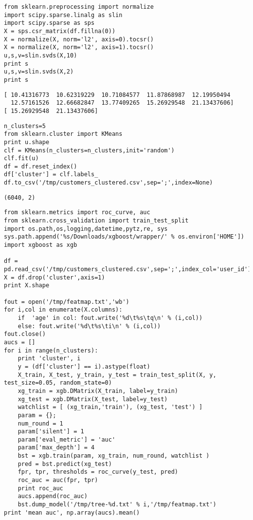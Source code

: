\documentclass[12pt,fleqn]{article}\usepackage{../common}
\begin{document}
\begin{verbatim}
from sklearn.preprocessing import normalize
import scipy.sparse.linalg as slin
import scipy.sparse as sps
X = sps.csr_matrix(df.fillna(0))
X = normalize(X, norm='l2', axis=0).tocsr()
X = normalize(X, norm='l2', axis=1).tocsr()    
u,s,v=slin.svds(X,10)
print s
u,s,v=slin.svds(X,2)
print s
\end{verbatim}

\begin{verbatim}
[ 10.41316773  10.62319229  10.71084577  11.87868987  12.19950494
  12.57161526  12.66682847  13.77409265  15.26929548  21.13437606]
[ 15.26929548  21.13437606]
\end{verbatim}

\begin{verbatim}
n_clusters=5
from sklearn.cluster import KMeans
print u.shape
clf = KMeans(n_clusters=n_clusters,init='random')
clf.fit(u)    
df = df.reset_index()
df['cluster'] = clf.labels_
df.to_csv('/tmp/customers_clustered.csv',sep=';',index=None)
\end{verbatim}

\begin{verbatim}
(6040, 2)
\end{verbatim}

\begin{verbatim}
from sklearn.metrics import roc_curve, auc
from sklearn.cross_validation import train_test_split
import os.path,os,logging,datetime,pytz,re, sys
sys.path.append('%s/Downloads/xgboost/wrapper/' % os.environ['HOME'])
import xgboost as xgb

df = pd.read_csv('/tmp/customers_clustered.csv',sep=';',index_col='user_id')
X = df.drop('cluster',axis=1)
print X.shape

fout = open('/tmp/featmap.txt','wb')
for i,col in enumerate(X.columns):
    if  'age' in col: fout.write('%d\t%s\tq\n' % (i,col))
    else: fout.write('%d\t%s\ti\n' % (i,col))    
fout.close()
aucs = []
for i in range(n_clusters):
    print 'cluster', i
    y = (df['cluster'] == i).astype(float)
    X_train, X_test, y_train, y_test = train_test_split(X, y, test_size=0.05, random_state=0)
    xg_train = xgb.DMatrix(X_train, label=y_train)
    xg_test = xgb.DMatrix(X_test, label=y_test)    
    watchlist = [ (xg_train,'train'), (xg_test, 'test') ]    
    param = {}; 
    num_round = 1
    param['silent'] = 1
    param['eval_metric'] = 'auc'
    param['max_depth'] = 4
    bst = xgb.train(param, xg_train, num_round, watchlist )
    pred = bst.predict(xg_test)
    fpr, tpr, thresholds = roc_curve(y_test, pred)
    roc_auc = auc(fpr, tpr)
    print roc_auc
    aucs.append(roc_auc)
    bst.dump_model('/tmp/tree-%d.txt' % i,'/tmp/featmap.txt')
print 'mean auc', np.array(aucs).mean()
\end{verbatim}
\end{document}
